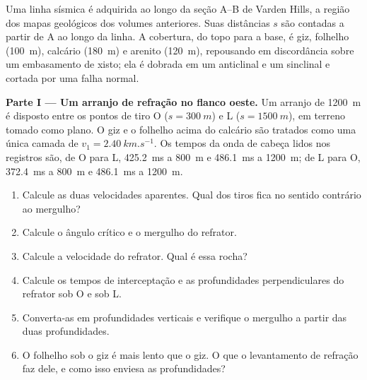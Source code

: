 \begin{problem}
\label{pb:b3:exploration-seismology:1}
Uma linha sísmica é adquirida ao longo da seção A--B de Varden Hills, a região dos
mapas geológicos dos volumes anteriores. Suas distâncias $s$ são contadas a partir de
A ao longo da linha. A cobertura, do topo para a base, é giz, folhelho (\qty{100}{m}),
calcário (\qty{180}{m}) e arenito (\qty{120}{m}), repousando em discordância sobre
um embasamento de xisto; ela é dobrada em um anticlinal e um sinclinal e cortada por uma
falha normal.

\medskip
\noindent\textbf{Parte I --- Um arranjo de refração no flanco oeste.} Um arranjo de
\qty{1200}{m} é disposto entre os pontos de tiro O ($s = \qty{300}{m}$) e L
($s = \qty{1500}{m}$), em terreno tomado como plano. O giz e o folhelho acima do
calcário são tratados como uma única camada de $v_1 = \qty{2.40}{km.s^{-1}}$. Os
tempos da onda de cabeça lidos nos registros são, de O para L, \qty{425.2}{ms} a
\qty{800}{m} e \qty{486.1}{ms} a \qty{1200}{m}; de L para O,
\qty{372.4}{ms} a \qty{800}{m} e \qty{486.1}{ms} a \qty{1200}{m}.
\begin{enumerate}
  \item Calcule as duas velocidades aparentes. Qual dos tiros fica no sentido contrário ao mergulho?
  \item Calcule o ângulo crítico e o mergulho do refrator.
  \item Calcule a velocidade do refrator. Qual é essa rocha?
  \item Calcule os tempos de interceptação e as profundidades perpendiculares do
        refrator sob O e sob L.
  \item Converta-as em profundidades verticais e verifique o mergulho a partir das duas profundidades.
  \item O folhelho sob o giz é mais lento que o giz. O que o levantamento de
        refração faz dele, e como isso enviesa as profundidades?
\end{enumerate}


\end{problem}
